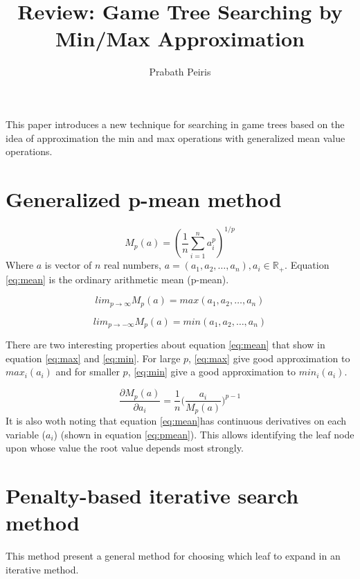\documentclass{article}
\begin{document}
\author{Prabath Peiris}
\date{}
\title{Review: Game Tree Searching by Min/Max Approximation}
\maketitle
This paper \cite{Rivest:1987:GTS:42942.42945} introduces a new technique for searching in game trees based on the idea of approximation the min and max operations with generalized mean value operations.

\section*{Generalized p-mean method}
\begin{equation}
M_p(a) = (\frac{1}{n} \sum_{i=1}^{n} a_i^p)^{1/p}
\label{eq:mean}
\end{equation}
Where $a$ is vector of $n$ real numbers, $a=(a_1, a_2, \dots, a_n), a_i\in\mathbb{R_{+}}$. Equation \ref{eq:mean} is the ordinary arithmetic mean (p-mean).


\begin{equation}
lim_{p\rightarrow\infty} M_{p}(a) = max(a_1, a_2, \dots, a_n)
\label{eq:max}
\end{equation}

\begin{equation}
lim_{p\rightarrow -\infty} M_{p}(a) = min(a_1, a_2, \dots, a_n)
\label{eq:min}
\end{equation}

There are two interesting properties about equation \ref{eq:mean} that show in equation \ref{eq:max} and \ref{eq:min}. For large $p$, \ref{eq:max} give good approximation to $max_i(a_i)$ and for smaller $p$, \ref{eq:min} give a good approximation to $min_i(a_i)$.

\begin{equation}
\frac{\partial M_p(a)}{\partial a_i} = \frac{1}{n} \Big(\frac{a_i}{M_p(a)}\Big)^{p-1}
\label{eq:pmean}
\end{equation}
It is also woth noting that equation \ref{eq:mean}has continuous derivatives on each variable ($a_i$) (shown in equation \ref{eq:pmean}). This allows identifying the leaf node upon whose value the root value depends most strongly.


\section*{Penalty-based iterative search method}

This method present a general method for choosing which leaf to expand in an iterative method.
\end{document}

